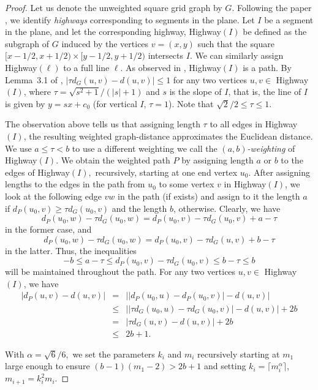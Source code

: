 \documentclass[12pt]{article}
\theoremstyle{plain}
\theoremstyle{definition}
\theoremstyle{remark}
\begin{document}
\begin{proof}
Let us denote the unweighted square grid graph by $G$. Following the paper \cite{CaC26}, we identify \emph{highways} corresponding to segments in the plane. Let $I$ be a segment in the plane, and let the corresponding highway, Highway$(I)$ be defined as the subgraph of $G$ induced by the vertices $v=(x,y)$ such that the square $[x-1/2,x+1/2)\times[y-1/2,y+1/2)$ intersects $I$. We can similarly assign Highway$(\ell)$ to a full line $\ell$. As observed in \cite{CaC26},  Highway$(I)$ is a path. By Lemma~3.1 of \cite{CaC26}, $|\tau d_G(u,v)-d(u,v)|\le1$ for any two vertices $u,v\in$ Highway$(I)$, where $\tau=\sqrt{s^2+1}/(|s|+1)$ and $s$ is the slope of $I$, that is, the line of $I$ is given by $y=sx+c_0$ (for vertical $I$, $\tau=1$). Note that $\sqrt2/2\le \tau\le1$.

The observation above tells us that assigning length $\tau$ to all edges in Highway$(I)$, the resulting weighted graph-distance approximates the Euclidean distance. We use $a\le \tau<b$ to use a different weighting we call the \emph{$(a,b)$-weighting} of Highway$(I)$. We obtain the weighted path $P$ by assigning length $a$ or $b$ to the edges of Highway$(I),$ recursively, starting at one end vertex $u_0$. After assigning lengths to the edges in the path from $u_0$ to some vertex $v$ in Highway$(I)$, we look at the following edge $vw$ in the path (if exists) and assign to it the length $a$ if $d_P(u_0,v)\ge \tau d_G(u_0,v)$ and the length $b$, otherwise. Clearly, we have $$d_P(u_0,w)-\tau d_G(u_0,w)=d_P(u_0,v)-\tau d_G(u_0,v)+a-\tau$$ in the former case, and $$d_P(u_0,w)-\tau d_G(u_0,w)=d_P(u_0,v)-\tau d_G(u,v)+b-\tau$$ in the latter. Thus, the inequalities $$-b\le a-\tau\le d_P(u_0,v)-\tau d_G(u_0,v)\le b-\tau\le b$$ will be maintained throughout the path. For any two vertices $u,v\in$ Highway$(I)$, we have
\begin{eqnarray*}
|d_P(u,v)-d(u,v)|&=&\big||d_P(u_0,u)-d_P(u_0,v)|-d(u,v)\big|\\
&\le&\big||\tau d_G(u_0,u)-\tau d_G(u_0,v)|-d(u,v)\big|+2b\\
&=&|\tau d_G(u,v)-d(u,v)|+2b\\
&\le&2b+1.
\end{eqnarray*}

With $\alpha=\sqrt6/6,$ we set the parameters $k_i$ and $m_i$ recursively starting at $m_1$ large enough to ensure $(b-1)(m_1-2)>2b+1$ and setting $k_i=\lceil m_i^\alpha\rceil$, $m_{i+1}=k_i^2m_i$.


\end{proof}
\end{document}
